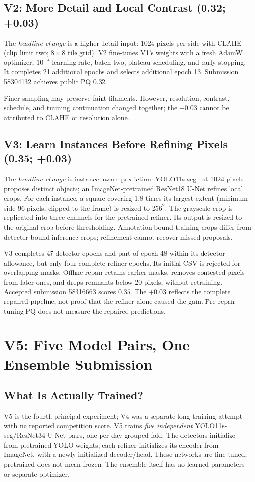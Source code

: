 \documentclass[sigconf]{acmart}
\begin{document}
\subsection{V2: More Detail and Local Contrast (0.32; +0.03)}
The \emph{headline change} is a higher-detail input: 1024 pixels per side
with CLAHE~\cite{opencvclahevisual} (clip limit two; $8\times8$ tile grid).
V2 fine-tunes V1's weights with a fresh AdamW optimizer,
$10^{-4}$ learning rate, batch two, plateau scheduling, and early stopping.
It completes 21 additional epochs and selects additional epoch 13.
Submission 58304132 achieves public PQ 0.32.

Finer sampling may preserve faint filaments. However, resolution, contrast,
schedule, and training continuation changed together; the +0.03 cannot be
attributed to CLAHE or resolution alone.

\subsection{V3: Learn Instances Before Refining Pixels (0.35; +0.03)}
The \emph{headline change} is instance-aware prediction:
YOLO11s-seg~\cite{ultralyticsvisual} at 1024 pixels proposes distinct objects;
an ImageNet-pretrained ResNet18 U-Net refines local crops.
For each instance, a square covering 1.8 times its largest extent
(minimum side 96 pixels, clipped to the frame) is resized to $256^2$.
The grayscale crop is replicated into three channels for the pretrained
refiner. Its output is resized to the original crop before thresholding.
Annotation-bound training crops differ from detector-bound inference crops;
refinement cannot recover missed proposals.

V3 completes 47 detector epochs and part of epoch 48 within its detector
allowance, but only four complete refiner epochs. Its initial CSV is
rejected for overlapping masks. Offline repair retains earlier masks,
removes contested pixels from later ones, and drops remnants below 20
pixels, without retraining. Accepted submission 58316663 scores 0.35.
The +0.03 reflects the complete repaired pipeline, not proof that the
refiner alone caused the gain. Pre-repair tuning PQ does not measure the
repaired predictions.

\section{V5: Five Model Pairs, One Ensemble Submission}
\subsection{What Is Actually Trained?}
V5 is the fourth principal experiment; V4 was a separate long-training
attempt with no reported competition score. V5 trains \emph{five independent}
YOLO11s-seg/ResNet34-U-Net pairs, one per day-grouped fold.
The detectors initialize from pretrained YOLO weights; each refiner
initializes its encoder from ImageNet, with a newly initialized decoder/head.
These networks are fine-tuned; pretrained does not mean frozen.
The ensemble itself has no learned parameters or separate optimizer.
\end{document}
